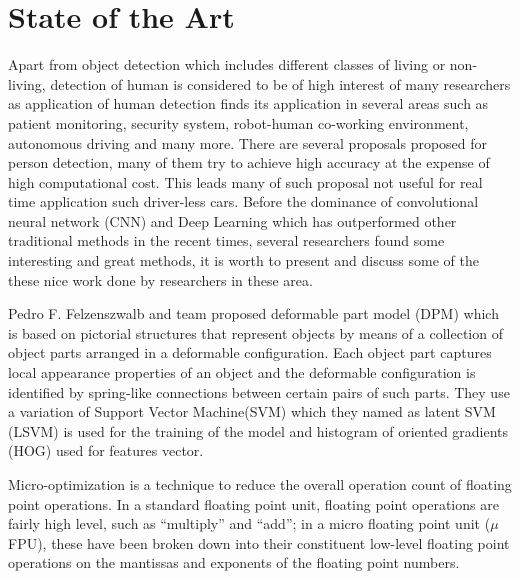\chapter{State of the Art}
Apart from object detection which includes different classes of living or non-living, detection of human is considered to be of high  interest of many researchers as application of human detection finds its application in several areas such as patient monitoring, security system, robot-human co-working environment, autonomous driving and many more. There are several proposals proposed for person detection, many of them try to achieve high accuracy at the expense of high computational cost. This leads many of such proposal not useful for real time application such driver-less cars.   
Before the dominance of convolutional neural network (CNN) and Deep Learning which has outperformed other traditional methods in the recent times, several researchers found some interesting and great methods, it is worth to present and discuss some of the these nice work done by researchers in these area. 
\par
Pedro F. Felzenszwalb and team proposed deformable part model (DPM) \cite{felzenszwalb2009object} which is based on pictorial structures that represent objects by means of a collection of object parts arranged in a deformable configuration. Each object part captures local appearance properties of
an object and the deformable configuration is identified  by spring-like connections between certain pairs of such parts. They use a variation of Support Vector Machine(SVM) which they named as latent SVM (LSVM) is used for the training of the model and  histogram of oriented gradients (HOG) used for features vector.


Micro-optimization is a technique to reduce the overall operation count of
floating point operations.  In a standard floating point unit, floating
point operations are fairly high level, such as ``multiply'' and ``add'';
in a micro floating point unit ($\mu$FPU), these have been broken down into
their constituent low-level floating point operations on the mantissas and
exponents of the floating point numbers.


